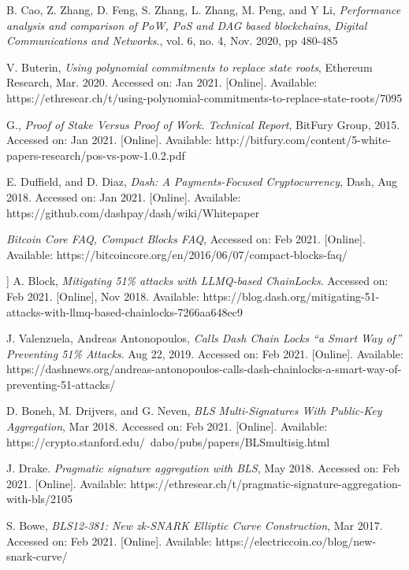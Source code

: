 \documentclass[peerreview]{ieeesyscoin}
\begin{document}
\begin{thebibliography}{00}
 B. Cao, Z. Zhang, D. Feng, S. Zhang, L. Zhang, M. Peng, and
Y Li, \textit{Performance analysis and comparison of PoW, PoS and DAG based blockchains}, \emph{Digital Communications and Networks}., vol. 6, no. 4, Nov. 2020, pp 480-485

 V. Buterin, \textit{Using polynomial commitments to replace state roots}, Ethereum Research, Mar. 2020. Accessed on: Jan 2021. [Online]. Available: https://ethresear.ch/t/using-polynomial-commitments-to-replace-state-roots/7095

 G., \textit{Proof of Stake Versus Proof of Work. Technical Report}, BitFury Group, 2015. Accessed on: Jan 2021. [Online]. Available: http://bitfury.com/content/5-white-papers-research/pos-vs-pow-1.0.2.pdf 

 E. Duffield, and D. Diaz, \textit{Dash: A Payments-Focused Cryptocurrency}, Dash, Aug 2018. Accessed on: Jan 2021. [Online]. Available: https://github.com/dashpay/dash/wiki/Whitepaper

 \textit{Bitcoin Core FAQ, Compact Blocks FAQ}, Accessed on: Feb 2021. [Online]. Available: https://bitcoincore.org/en/2016/06/07/compact-blocks-faq/

 ] A. Block, \textit{Mitigating 51\% attacks with LLMQ-based ChainLocks}. Accessed on: Feb 2021. [Online], Nov 2018. Available: https://blog.dash.org/mitigating-51-attacks-with-llmq-based-chainlocks-7266aa648ec9

 J. Valenzuela, Andreas Antonopoulos, \textit{Calls Dash Chain Locks “a Smart Way of” Preventing 51\% Attacks}. Aug 22, 2019. Accessed on: Feb 2021. [Online]. Available: https://dashnews.org/andreas-antonopoulos-calls-dash-chainlocks-a-smart-way-of-preventing-51-attacks/

 D. Boneh, M. Drijvers, and G. Neven, \textit{BLS Multi-Signatures With Public-Key Aggregation}, Mar 2018. Accessed on: Feb 2021. [Online]. Available: https://crypto.stanford.edu/~dabo/pubs/papers/BLSmultisig.html

 J. Drake. \textit{Pragmatic signature aggregation with BLS}, May 2018. Accessed on: Feb 2021. [Online]. Available:  https://ethresear.ch/t/pragmatic-signature-aggregation-with-bls/2105

 S. Bowe, \textit{BLS12-381: New zk-SNARK Elliptic Curve Construction}, Mar 2017. Accessed on: Feb 2021. [Online]. Available: https://electriccoin.co/blog/new-snark-curve/


\end{thebibliography}
\end{document}
